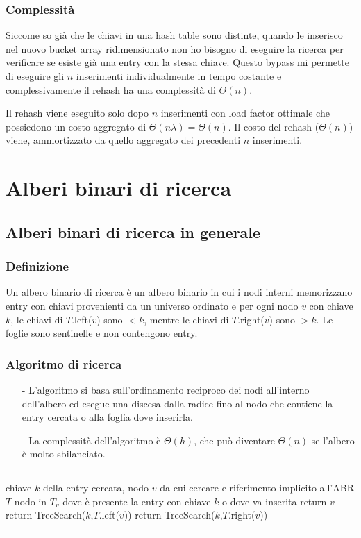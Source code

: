 \documentclass[a4paper]{article}
\makeatletter
\newenvironment{algo}[4]{
	\noindent\rule{\textwidth}{0.4pt}
	\begin{algorithmic}[1]
		\addtocounter{ALG@line}{-1}
		\Procedure{#1}{#2}
		\Require #3
		\Ensure #4
		\Statex }{
		\EndProcedure
	\end{algorithmic}
	\rule{\textwidth}{0.4pt}}
\makeatother
\begin{document}
\subsubsection*{Complessità}
Siccome so già che le chiavi in una hash table sono distinte, quando le inserisco nel nuovo bucket array ridimensionato non ho
bisogno di eseguire la ricerca per verificare se esiste già una entry con la stessa chiave. Questo bypass mi permette di eseguire
gli \(n\) inserimenti individualmente in tempo costante e complessivamente il rehash ha una complessità di \(\Theta(n)\).

Il rehash viene eseguito solo dopo \(n\) inserimenti con load factor ottimale che possiedono un costo aggregato di \(\Theta(n \lambda)
= \Theta(n)\). Il costo del rehash (\(\Theta(n)\)) viene, ammortizzato da quello aggregato dei precedenti \(n\) inserimenti.

\newpage

\section{Alberi binari di ricerca}
\subsection{Alberi binari di ricerca in generale}
\subsubsection*{Definizione}
Un albero binario di ricerca è un albero binario in cui i nodi interni memorizzano entry con chiavi provenienti da un universo
ordinato e per ogni nodo \(v\) con chiave \(k\), le chiavi di \(T\).left(\(v\)) sono \(< k\), mentre le chiavi di
\(T\).right(\(v\)) sono \(> k\). Le foglie sono sentinelle e non contengono entry.

\subsubsection*{Algoritmo di ricerca}
\begin{itemize}[topsep=3pt, itemsep=0pt]
	\item[-] L'algoritmo si basa sull'ordinamento reciproco dei nodi all'interno dell'albero ed esegue una discesa dalla radice
	fino al nodo che contiene la entry cercata o alla foglia dove inserirla.
	\item[-] La complessità dell'algoritmo è \(\Theta(h)\), che può diventare \(\Theta(n)\) se l'albero è molto sbilanciato.
\end{itemize}
\begin{algo}{TreeSearch}{$k$, $v$}{chiave $k$ della entry cercata, nodo $v$ da cui cercare e riferimento implicito all'ABR $T$}{nodo in $T_v$ dove è presente la entry con chiave $k$ o dove va inserita}
		\State return $v$
	\EndIf
		\State return TreeSearch($k$,$T$.left($v$))
	\Else
		\State return TreeSearch($k$,$T$.right($v$))
	\EndIf
\end{algo}
\end{document}
